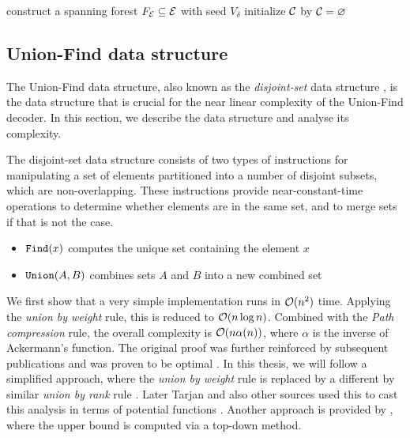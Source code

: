 \begin{algo}[algotitle=Peeling decoder for bounded surfaces (adapted from \cite{delfosse2017linear}), label=algo:peelbound]
  \begin{algorithm}[H]
    \BlankLine
    construct a spanning forest $F_{\mathcal{E}}\subseteq\mathcal{E}$ with seed $V_\delta$\;
    initialize $\mathcal{C}$ by $\mathcal{C} = {\varnothing}$\;
  \end{algorithm}
\end{algo}





\subsection{Union-Find data structure}
The Union-Find data structure, also known as the \emph{disjoint-set} data structure \cite{tarjan1975efficiency}, is the data structure that is crucial for the near linear complexity of the Union-Find decoder. In this section, we describe the data structure and analyse its complexity. 

The disjoint-set data structure consists of two types of instructions for manipulating a set of elements partitioned into a number of disjoint subsets, which are non-overlapping. These instructions provide near-constant-time operations to determine whether elements are in the same set, and to merge sets if that is not the case. 
\begin{itemize}
  \item $\texttt{Find}(x)$ computes the unique set containing the element $x$
  \item $\texttt{Union}(A,B)$ combines sets $A$ and $B$ into a new combined set
\end{itemize}
We first show that a very simple implementation runs in $\mathcal{O}(n^2)$ time. Applying the \emph{union by weight} rule, this is reduced to $\mathcal{O}(n \log n)$. Combined with the \emph{Path compression} rule, the overall complexity is $\mathcal{O}(n \alpha (n))$, where $\alpha$ is the inverse of Ackermann's function. The original proof \cite{tarjan1975efficiency} was further reinforced by subsequent publications \cite{tarjan1979class,tarjan1984worst} and was proven to be optimal \cite{fredman1989cell}. In this thesis, we will follow a simplified approach, where the \emph{union by weight} rule is replaced by a different by similar \emph{union by rank} rule \cite{kozen1992design}. Later Tarjan and also other sources used this to cast this analysis in terms of potential functions \cite{tarjan1999handout, harfst2000potential, cormen2009introduction}. Another approach is provided by \cite{seidel2005top}, where the upper bound is computed via a top-down method. 


